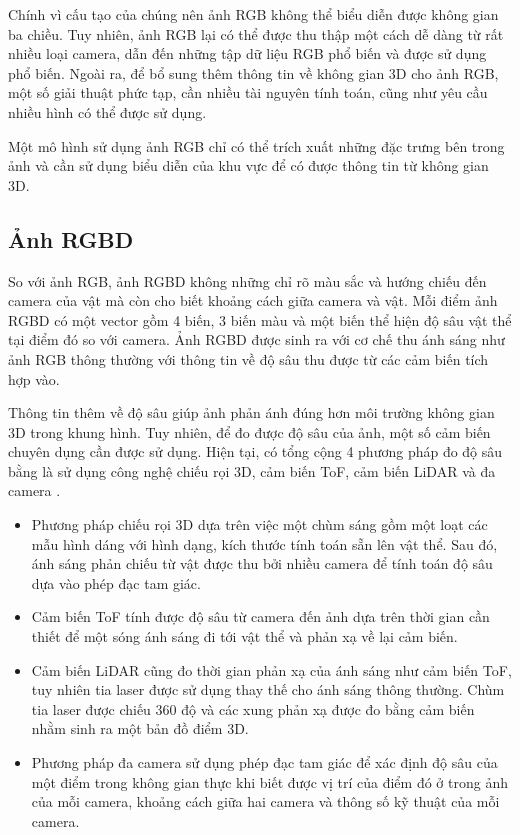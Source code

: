 Chính vì cấu tạo của chúng nên ảnh RGB không thể biểu diễn được không gian ba chiều. Tuy nhiên, ảnh RGB lại có thể được thu thập một cách dễ dàng từ rất nhiều loại camera, dẫn đến những tập dữ liệu RGB phổ biến và được sử dụng phổ biến. Ngoài ra, để bổ sung thêm thông tin về không gian 3D cho ảnh RGB, một số giải thuật phức tạp, cần nhiều tài nguyên tính toán, cũng như yêu cầu nhiều hình có thể được sử dụng.

Một mô hình sử dụng ảnh RGB chỉ có thể trích xuất những đặc trưng bên trong ảnh và cần sử dụng biểu diễn của khu vực để có được thông tin từ không gian 3D.

\subsection{Ảnh RGBD}

So với ảnh RGB, ảnh RGBD không những chỉ rõ màu sắc và hướng chiếu đến camera của vật mà còn cho biết khoảng cách giữa camera và vật. Mỗi điểm ảnh RGBD có một vector gồm 4 biến, 3 biến màu và một biến thể hiện độ sâu vật thể tại điểm đó so với camera. Ảnh RGBD được sinh ra với cơ chế thu ánh sáng như ảnh RGB thông thường với thông tin về độ sâu thu được từ các cảm biến tích hợp vào.

Thông tin thêm về độ sâu giúp ảnh phản ánh đúng hơn môi trường không gian 3D trong khung hình. Tuy nhiên, để đo được độ sâu của ảnh, một số cảm biến chuyên dụng cần được sử dụng. Hiện tại, có tổng cộng 4 phương pháp đo độ sâu bằng là sử dụng công nghệ chiếu rọi 3D, cảm biến ToF, cảm biến LiDAR và đa camera \cite{lopes2022survey}.
\begin{itemize}
    \item Phương pháp chiếu rọi 3D dựa trên việc một chùm sáng gồm một loạt các mẫu hình dáng với hình dạng, kích thước tính toán sẵn lên vật thể. Sau đó, ánh sáng phản chiếu từ vật được thu bởi nhiều camera để tính toán độ sâu dựa vào phép đạc tam giác.
    \item Cảm biến ToF tính được độ sâu từ camera đến ảnh dựa trên thời gian cần thiết để một sóng ánh sáng đi tới vật thể và phản xạ về lại cảm biến.
    \item Cảm biến LiDAR cũng đo thời gian phản xạ của ánh sáng như cảm biến ToF, tuy nhiên tia laser được sử dụng thay thế cho ánh sáng thông thường. Chùm tia laser được chiếu 360 độ và các xung phản xạ được đo bằng cảm biến nhằm sinh ra một bản đồ điểm 3D.
    \item Phương pháp đa camera sử dụng phép đạc tam giác để xác định độ sâu của một điểm trong không gian thực khi biết được vị trí của điểm đó ở trong ảnh của mỗi camera, khoảng cách giữa hai camera và thông số kỹ thuật của mỗi camera.
\end{itemize}

